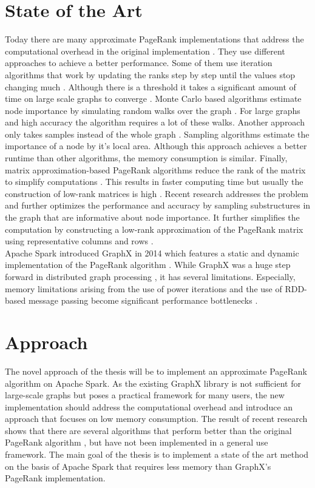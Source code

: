 \documentclass[a4paper,12pt]{article}
\begin{document}
\section{State of the Art}
Today there are many approximate PageRank implementations that address the computational overhead in the original implementation \cite{wu_efficient_2024}. They use different approaches to achieve a better performance. Some of them use iteration algorithms that work by updating the ranks step by step until the values stop changing much \cite{xie_parameterized_2023}\cite{anikin_efficient_2022}. Although there is a threshold it takes a significant amount of time on large scale graphs to converge \cite{wu_efficient_2024}. Monte Carlo based algorithms estimate node importance by simulating random walks over the graph \cite{avrachenkov_monte_2007}. For large graphs and high accuracy the algorithm requires a lot of these walks. Another approach only takes samples instead of the whole graph \cite{wu_approxrank_2009}\cite{bar-yossef_local_2008}. Sampling algorithms estimate the importance of a node by it's local area. Although this approach achieves a better runtime than other algorithms, the memory consumption is similar. Finally, matrix approximation-based PageRank algorithms reduce the rank of the matrix to simplify computations \cite{liu_fast_2015}. This results in faster computing time but usually the construction of low-rank matrices is high . Recent research addresses the problem and further optimizes the performance and accuracy by sampling substructures in the graph that are informative about node importance. It further simplifies the computation by constructing a low-rank approximation of the PageRank matrix using representative columns and rows \cite{wu_efficient_2024}. \\Apache Spark introduced GraphX in 2014 which features a static and dynamic implementation of the PageRank algorithm \cite{xin_graphx_2013}. While GraphX was a huge step forward in distributed graph processing \cite{gonzalez_graphx_2014-1}, it has several limitations. Especially, memory limitations arising from the use of power iterations \cite{page_pagerank_1999} and the use of RDD-based message passing become significant performance bottlenecks \cite{xin_graphx_2014}\cite{xin_graphx_2013}.
 

\section{Approach}
The novel approach of the thesis will be to implement an approximate PageRank algorithm on Apache Spark. As the existing GraphX library is not sufficient for large-scale graphs but poses a practical framework for many users, the new implementation should address the computational overhead and introduce an approach that focuses on low memory consumption. 
The result of recent research shows that there are several algorithms that perform better than the original PageRank algorithm \cite{wu_efficient_2024}, but have not been implemented in a general use framework. The main goal of the thesis is to implement a state of the art method on the basis of Apache Spark that requires less memory than GraphX's PageRank implementation. 
\end{document}

